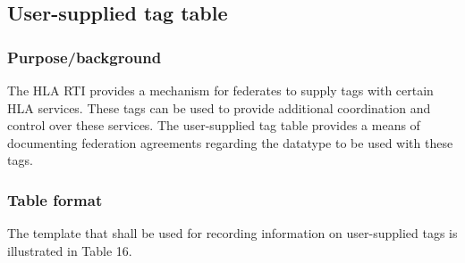\subsection{User-supplied tag table}

\subsubsection{Purpose/background}
The HLA RTI provides a mechanism for federates to supply tags with certain HLA services. These tags can be used to provide additional coordination and control over these services. The user-supplied tag table provides a means of documenting federation agreements regarding the datatype to be used with these tags.

\vspace{-11.8pt}

\subsubsection{Table format}
\vspace{-2.8pt}
The template that shall be used for recording information on user-supplied tags is illustrated in Table 16.

